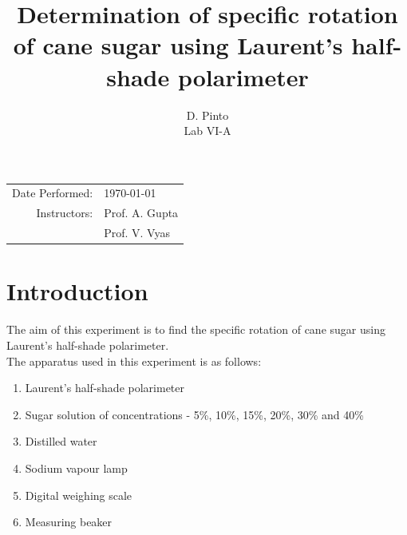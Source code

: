 \documentclass{dkpinto-report}
\title{\bfseries Determination of specific rotation of cane sugar using Laurent's half-shade polarimeter} %
\author{D. Pinto \\ Lab VI-A} %
\date{\vspace{-5ex}} %
\begin{document}
\begin{titlepage}
\maketitle 

\begin{center} %
\begin{tabular}{r l} %
Date Performed: & \today \\ 
Instructors: & Prof. A. Gupta \\  
			 & Prof. V. Vyas
\end{tabular}
\end{center}


\tableofcontents  %
\thispagestyle{empty}  %

\end{titlepage}



\section{Introduction} %
The aim of this experiment is to find the specific rotation of cane sugar using Laurent's half-shade polarimeter.\\
The apparatus used in this experiment is as follows:

\begin{enumerate}  %
\itemsep0em  %
\item Laurent's half-shade polarimeter
\item Sugar solution of concentrations - 5\%, 10\%, 15\%, 20\%, 30\% and 40\%  %
\item Distilled water
\item Sodium vapour lamp
\item Digital weighing scale
\item Measuring beaker   
\end{enumerate}



\end{document}

